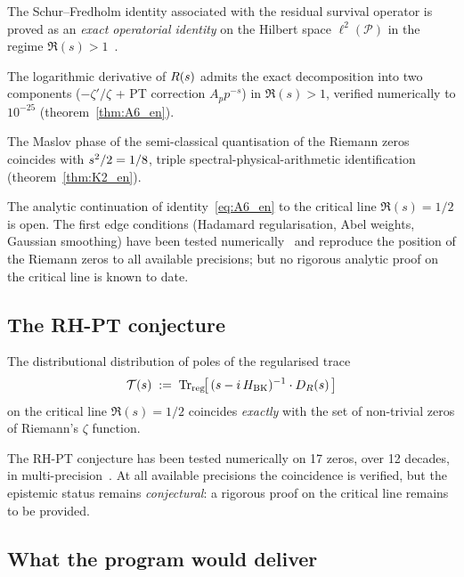 \begin{description}[nosep,leftmargin=*]
\item[Theorem.] The Schur--Fredholm identity associated with the residual survival operator is proved as an \emph{exact operatorial identity} on the Hilbert space $\ell^{2}(\mathcal P)$ in the regime $\Re(s) > 1$~\cite{PT_NewMath_Consolidation}.
\item[Identity A6.] The logarithmic derivative of $R(s)$ admits the exact decomposition into two components ($-\zeta'/\zeta$ + PT correction $A_p p^{-s}$) in $\Re(s) > 1$, verified numerically to $10^{-25}$ (theorem~\ref{thm:A6_en}).
\item[Identity K2.] The Maslov phase of the semi-classical quantisation of the Riemann zeros coincides with $s^{2}/2 = 1/8$, triple spectral-physical-arithmetic identification (theorem~\ref{thm:K2_en}).
\item[Conjectural.] The analytic continuation of identity~\eqref{eq:A6_en} to the critical line $\Re(s) = 1/2$ is open. The first edge conditions (Hadamard regularisation, Abel weights, Gaussian smoothing) have been tested numerically~\cite{PT_NewMath_Consolidation} and reproduce the position of the Riemann zeros to all available precisions; but no rigorous analytic proof on the critical line is known to date.
\end{description}

\subsection{The RH-PT conjecture}
\label{sec:programme:conjecture}

\begin{conjecture}
\label{conj:RH_PT_en}
The distributional distribution of poles of the regularised trace
\[
\mathcal T(s) \;:=\; \mathrm{Tr}_{\rm reg}\!\bigl[\,(s - i\,H_{\rm BK})^{-1} \cdot D_R(s)\,\bigr]
\]
on the critical line $\Re(s) = 1/2$ coincides \emph{exactly} with the set of non-trivial zeros of Riemann's $\zeta$ function.
\end{conjecture}

The RH-PT conjecture has been tested numerically on 17 zeros, over 12 decades, in multi-precision~\cite[Notes 66--69]{PT_NewMath_Consolidation}. At all available precisions the coincidence is verified, but the epistemic status remains \emph{conjectural}: a rigorous proof on the critical line remains to be provided.

\subsection{What the program would deliver}
\label{sec:programme:portee}

